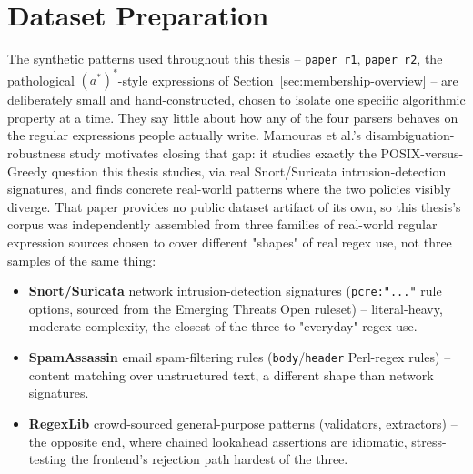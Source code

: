 \section{Dataset Preparation}
\label{sec:dataset-preparation}

The synthetic patterns used throughout this thesis -- \texttt{paper\_r1},
\texttt{paper\_r2}, the pathological $(a^{*})^{*}$-style expressions of
Section~\ref{sec:membership-overview} -- are deliberately small and
hand-constructed, chosen to isolate one specific algorithmic property at
a time. They say little about how any of the four parsers behaves on the
regular expressions people actually write. Mamouras et al.'s
disambiguation-robustness study \citep{mamouras2024} motivates closing
that gap: it studies exactly the POSIX-versus-Greedy question this
thesis studies, via real Snort/Suricata intrusion-detection signatures,
and finds concrete real-world patterns where the two policies visibly
diverge. That paper provides no public dataset artifact of its own, so
this thesis's corpus was independently assembled from three families of
real-world regular expression sources chosen to cover different
"shapes" of real regex use, not three samples of the same thing:

\begin{itemize}
  \item \textbf{Snort/Suricata} network intrusion-detection signatures
  (\texttt{pcre:"..."} rule options, sourced from the Emerging Threats
  Open ruleset) -- literal-heavy, moderate complexity, the closest of
  the three to "everyday" regex use.
  \item \textbf{SpamAssassin} email spam-filtering rules
  (\texttt{body}/\texttt{header} Perl-regex rules) -- content matching
  over unstructured text, a different shape than network signatures.
  \item \textbf{RegexLib} crowd-sourced general-purpose patterns
  (validators, extractors) -- the opposite end, where chained lookahead
  assertions are idiomatic, stress-testing the frontend's rejection path
  hardest of the three.
\end{itemize}

